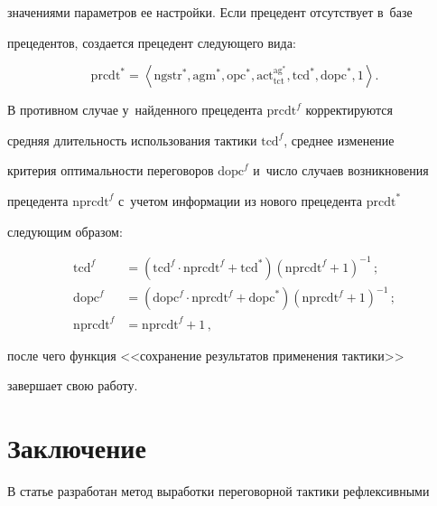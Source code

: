 значениями параметров ее настройки. Если прецедент отсутствует в~базе 


прецедентов, создается прецедент следующего вида:


  $$


  \mathrm{prcdt}^*=\left\langle \mathrm{ngstr}^*, \mathrm{agm}^*, \mathrm{opc}^*, \mathrm{act}^{\mathrm{ag}^*}_{\mathrm{tct}}, \mathrm{tcd}^*, \mathrm{dopc}^*, 


1\right\rangle.


  $$


  


  В противном случае у~найденного прецедента $\mathrm{prcdt}^f$ корректируются 


средняя длительность использования тактики $\mathrm{tcd}^f$, среднее изменение 


критерия оптимальности переговоров $\mathrm{dopc}^f$ и~число случаев возникновения 


прецедента $\mathrm{nprcdt}^f$ с~учетом информации из нового прецедента $\mathrm{prcdt}^*$ 


следующим образом:


  \begin{align*}


 \mathrm{tcd}^f&=\left( \mathrm{tcd}^f\cdot \mathrm{nprcdt}^f +\mathrm{tcd}^*\right) \left( \mathrm{nprcdt}^f+1\right)^{-1}\,;\\


  \mathrm{dopc}^f &= \left( \mathrm{dopc}^f \cdot \mathrm{nprcdt}^f+\mathrm{dopc}^*\right) \left( \mathrm{nprcdt}^f+1\right)^{-1}\,;\\


  \mathrm{nprcdt}^f&=\mathrm{nprcdt}^f+1\,,


  \end{align*}


  после чего функция <<сохранение результатов применения тактики>> 


завершает свою работу.





\section{Заключение}





  В статье разработан метод выработки переговорной тактики рефлексивными 


